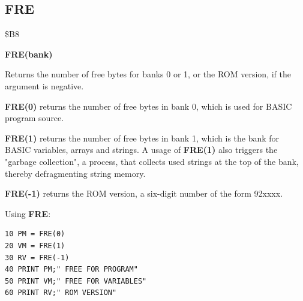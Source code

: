 \subsection{FRE}
\begin{description}[leftmargin=2cm,style=nextline]
\item [Token:] \$B8
\item [Format:] {\bf FRE(bank)}
\item [Usage:] Returns the number of free bytes for banks 0 or 1,
               or the ROM version, if the argument is negative.

               {\bf FRE(0)} returns the number of free bytes in
               bank 0, which is used for BASIC program source.

               {\bf FRE(1)} returns the number of free bytes in
               bank 1, which is the bank for BASIC variables, arrays
               and strings. A usage of {\bf FRE(1)} also triggers the
               "garbage collection", a process, that collects
               used strings at the top of the bank, thereby
               defragmenting string memory.

               {\bf FRE(-1)} returns the ROM version, a six-digit number
               of the form 92xxxx.

\item [Example:] Using {\bf FRE}:
\begin{tcolorbox}[colback=black,coltext=white]
\verbatimfont{\codefont}
\begin{verbatim}
10 PM = FRE(0)
20 VM = FRE(1)
30 RV = FRE(-1)
40 PRINT PM;" FREE FOR PROGRAM"
50 PRINT VM;" FREE FOR VARIABLES"
60 PRINT RV;" ROM VERSION"
\end{verbatim}
\end{tcolorbox}
\end{description}


\newpage
